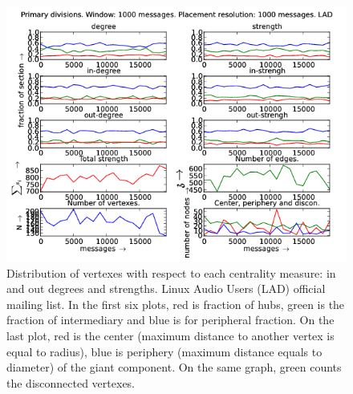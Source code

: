 \documentclass[%
 aip,
 jmp,%
 amsmath,amssymb,
 reprint,%
]{revtex4-1}
\begin{document}
\begin{figure}[hbtp] 
   \centering
        \includegraphics[width=\textwidth]{figs/LAD/1000}
    \caption{Distribution of vertexes with respect to each centrality measure: in and out degrees and strengths. Linux Audio Users (LAD) official mailing list. In the first six plots, red is fraction of hubs, green is the fraction of intermediary and blue is for peripheral fraction. On the last plot, red is the center (maximum distance to another vertex is equal to radius), blue is periphery (maximum distance equals to diameter) of the giant component. On the same graph, green counts the disconnected vertexes.}
    \label{fig:lad1000}
\end{figure}
\end{document}
